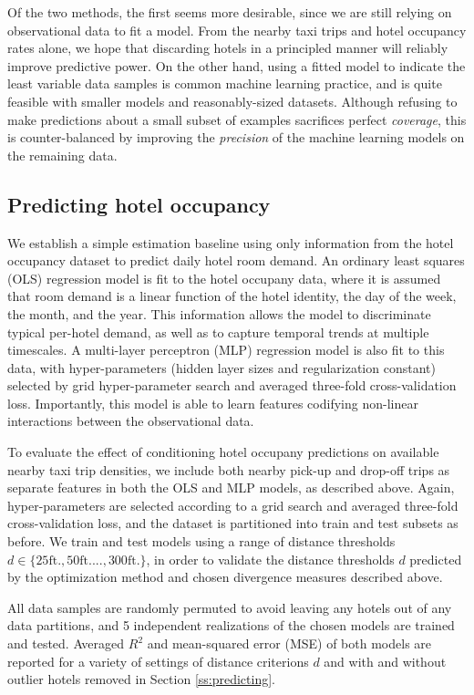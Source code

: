 \documentclass[useAMS, usenatbib]{biom}
\begin{document}
Of the two methods, the first seems more desirable, since we are still relying on observational data to fit a model. From the nearby taxi trips and hotel occupancy rates alone, we hope that discarding hotels in a principled manner will reliably improve predictive power. On the other hand, using a fitted model to indicate the least variable data samples is common machine learning practice, and is quite feasible with smaller models and reasonably-sized datasets. Although refusing to make predictions about a small subset of examples sacrifices perfect \textit{coverage}, this is counter-balanced by improving the \textit{precision} of the machine learning models on the remaining data.

\subsection{Predicting hotel occupancy}

We establish a simple estimation baseline using only information from the hotel occupancy dataset to predict daily hotel room demand. An ordinary least squares (OLS) regression model is fit to the hotel occupany data, where it is assumed that room demand is a linear function of the hotel identity, the day of the week, the month, and the year. This information allows the model to discriminate typical per-hotel demand, as well as to capture temporal trends at multiple timescales. A multi-layer perceptron (MLP) regression model is also fit to this data, with hyper-parameters (hidden layer sizes and regularization constant) selected by grid hyper-parameter search and averaged three-fold cross-validation loss. Importantly, this model is able to learn features codifying non-linear interactions between the observational data.

To evaluate the effect of conditioning hotel occupany predictions on available nearby taxi trip densities, we include both nearby pick-up and drop-off trips as separate features in both the OLS and MLP models, as described above. Again, hyper-parameters are selected according to a grid search and averaged three-fold cross-validation loss, and the dataset is partitioned into train and test subsets as before. We train and test models using a range of distance thresholds $d \in \{25 \mathrm{ft.}, 50 \mathrm{ft.} ..., 300 \mathrm{ft.} \}$, in order to validate the distance thresholds $d$ predicted by the optimization method and chosen divergence measures described above.

All data samples are randomly permuted to avoid leaving any hotels out of any data partitions, and 5 independent realizations of the chosen models are trained and tested. Averaged $R^2$ and mean-squared error (MSE) of both models are reported for a variety of settings of distance criterions $d$ and with and without outlier hotels removed in Section \ref{ss:predicting}.
\end{document}
